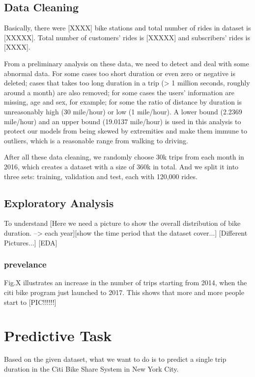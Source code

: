 \subsection{Data Cleaning}
	\par Basically, there were [XXXX] bike stations and total number of rides in dataset is [XXXXX]. Total number of customers' rides is [XXXXX] and subscribers' rides is [XXXX]. 
	\par From a preliminary analysis on these data, we need to detect and deal with some abnormal data. For some cases too short duration or even zero or negative is deleted; cases that takes too long duration in a trip (> 1 million seconds, roughly around a month) are also removed; for some cases the users' information are missing, age and sex, for example; for some the ratio of distance by duration is unreasonably high (30 mile/hour) or low (1 mile/hour). A lower bound (2.2369 mile/hour) and an upper bound (19.0137 mile/hour) is used in this analysis to protect our models from being skewed by extremities and make them immune to outliers, which is a reasonable range from walking to driving\cite{zheng}.
	\par After all these data cleaning, we randomly choose 30k trips from each month in 2016, which creates a dataset with a size of 360k in total. And we split it into three sets: training, validation and test, each with 120,000 rides.
\subsection{Exploratory Analysis}
	\par To understand [Here we need a picture to show the overall distribution of bike duration. --> each year][show the time period that the dataset cover...]
	[Different Pictures...]
	[EDA]
	\subsubsection{prevelance}
	\par Fig.X illustrates an increase in the number of trips starting from 2014, when the citi bike program just launched to 2017. This shows that more and more people start to [PIC!!!!!!]



\section{Predictive Task}
Based on the given dataset, what we want to do is to predict a single trip duration in the Citi Bike Share System in New York City.

